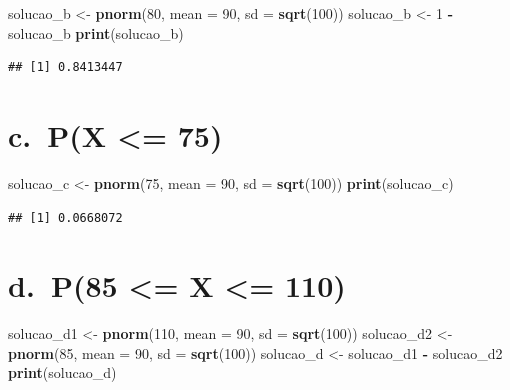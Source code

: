 \documentclass[
]{article}
\newenvironment{Shaded}{\begin{snugshade}}{\end{snugshade}}
\newcommand{\AttributeTok}[1]{\textcolor[rgb]{0.13,0.29,0.53}{#1}}
\newcommand{\DecValTok}[1]{\textcolor[rgb]{0.00,0.00,0.81}{#1}}
\newcommand{\FunctionTok}[1]{\textcolor[rgb]{0.13,0.29,0.53}{\textbf{#1}}}
\newcommand{\NormalTok}[1]{#1}
\newcommand{\OtherTok}[1]{\textcolor[rgb]{0.56,0.35,0.01}{#1}}
\newcommand{\SpecialCharTok}[1]{\textcolor[rgb]{0.81,0.36,0.00}{\textbf{#1}}}
\begin{document}
\begin{Shaded}
\begin{Highlighting}[]
\NormalTok{solucao\_b }\OtherTok{\textless{}{-}} \FunctionTok{pnorm}\NormalTok{(}\DecValTok{80}\NormalTok{, }\AttributeTok{mean =} \DecValTok{90}\NormalTok{, }\AttributeTok{sd =} \FunctionTok{sqrt}\NormalTok{(}\DecValTok{100}\NormalTok{))}
\NormalTok{solucao\_b }\OtherTok{\textless{}{-}} \DecValTok{1} \SpecialCharTok{{-}}\NormalTok{ solucao\_b}
\FunctionTok{print}\NormalTok{(solucao\_b)}
\end{Highlighting}
\end{Shaded}

\begin{verbatim}
## [1] 0.8413447
\end{verbatim}

\section{c.~P(X \textless= 75)}\label{c.-px-75}

\begin{Shaded}
\begin{Highlighting}[]
\NormalTok{solucao\_c }\OtherTok{\textless{}{-}} \FunctionTok{pnorm}\NormalTok{(}\DecValTok{75}\NormalTok{, }\AttributeTok{mean =} \DecValTok{90}\NormalTok{, }\AttributeTok{sd =} \FunctionTok{sqrt}\NormalTok{(}\DecValTok{100}\NormalTok{))}
\FunctionTok{print}\NormalTok{(solucao\_c)}
\end{Highlighting}
\end{Shaded}

\begin{verbatim}
## [1] 0.0668072
\end{verbatim}

\section{d.~P(85 \textless= X \textless= 110)}\label{d.-p85-x-110}

\begin{Shaded}
\begin{Highlighting}[]
\NormalTok{solucao\_d1 }\OtherTok{\textless{}{-}} \FunctionTok{pnorm}\NormalTok{(}\DecValTok{110}\NormalTok{, }\AttributeTok{mean =} \DecValTok{90}\NormalTok{, }\AttributeTok{sd =} \FunctionTok{sqrt}\NormalTok{(}\DecValTok{100}\NormalTok{))}
\NormalTok{solucao\_d2 }\OtherTok{\textless{}{-}} \FunctionTok{pnorm}\NormalTok{(}\DecValTok{85}\NormalTok{, }\AttributeTok{mean =} \DecValTok{90}\NormalTok{, }\AttributeTok{sd =} \FunctionTok{sqrt}\NormalTok{(}\DecValTok{100}\NormalTok{))}
\NormalTok{solucao\_d }\OtherTok{\textless{}{-}}\NormalTok{ solucao\_d1 }\SpecialCharTok{{-}}\NormalTok{ solucao\_d2}
\FunctionTok{print}\NormalTok{(solucao\_d)}
\end{Highlighting}
\end{Shaded}
\end{document}
